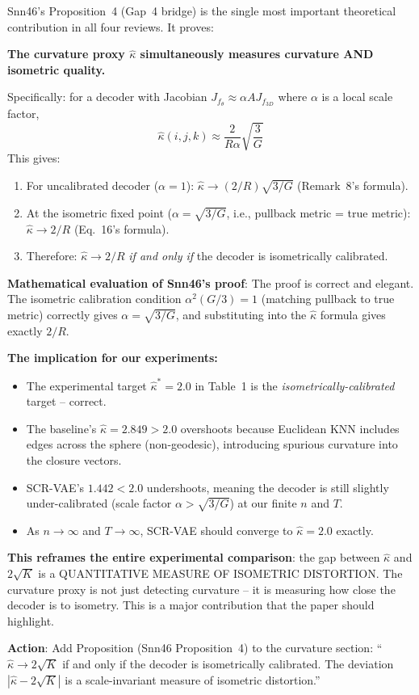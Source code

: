 \documentclass{article}
\begin{document}
\begin{highlight}
Snn46's Proposition~4 (Gap~4 bridge) is the single most important theoretical
contribution in all four reviews. It proves:

\textbf{The curvature proxy $\hat{\kappa}$ simultaneously measures curvature
AND isometric quality.}

Specifically: for a decoder with Jacobian $J_{f_\theta} \approx \alpha A J_{f_{3D}}$
where $\alpha$ is a local scale factor,
\[
  \hat{\kappa}(i,j,k) \approx \frac{2}{R\alpha}\sqrt{\frac{3}{G}}
\]
This gives:
\begin{enumerate}
  \item For uncalibrated decoder ($\alpha = 1$): $\hat{\kappa} \to (2/R)\sqrt{3/G}$
    (Remark~8's formula).
  \item At the isometric fixed point ($\alpha = \sqrt{3/G}$, i.e., pullback
    metric = true metric): $\hat{\kappa} \to 2/R$ (Eq.~16's formula).
  \item Therefore: $\hat{\kappa} \to 2/R$ \emph{if and only if} the decoder
    is isometrically calibrated.
\end{enumerate}

\textbf{Mathematical evaluation of Snn46's proof}: The proof is correct and elegant.
The isometric calibration condition $\alpha^2(G/3) = 1$ (matching pullback to
true metric) correctly gives $\alpha = \sqrt{3/G}$, and substituting into the
$\hat{\kappa}$ formula gives exactly $2/R$.

\textbf{The implication for our experiments:}
\begin{itemize}
  \item The experimental target $\hat{\kappa}^* = 2.0$ in Table~1 is the
    \emph{isometrically-calibrated} target -- correct.
  \item The baseline's $\hat{\kappa} = 2.849 > 2.0$ overshoots because
    Euclidean KNN includes edges across the sphere (non-geodesic), introducing
    spurious curvature into the closure vectors.
  \item SCR-VAE's $1.442 < 2.0$ undershoots, meaning the decoder is still
    slightly under-calibrated (scale factor $\alpha > \sqrt{3/G}$) at our finite
    $n$ and $T$.
  \item As $n \to \infty$ and $T \to \infty$, SCR-VAE should converge to
    $\hat{\kappa} = 2.0$ exactly.
\end{itemize}

\textbf{This reframes the entire experimental comparison}: the gap between
$\hat{\kappa}$ and $2\sqrt{K}$ is a QUANTITATIVE MEASURE OF ISOMETRIC DISTORTION.
The curvature proxy is not just detecting curvature -- it is measuring how close
the decoder is to isometry. This is a major contribution that the paper should
highlight.

\textbf{Action}: Add Proposition (Snn46 Proposition~4) to the curvature section:
``$\hat{\kappa} \to 2\sqrt{K}$ if and only if the decoder is isometrically
calibrated. The deviation $|\hat{\kappa} - 2\sqrt{K}|$ is a scale-invariant
measure of isometric distortion.''
\end{highlight}
\end{document}
